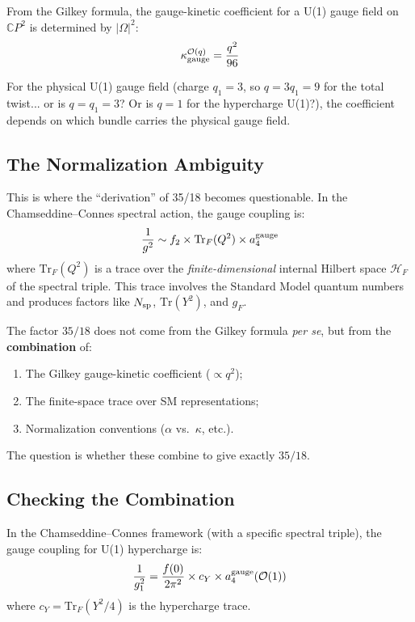 \documentclass[12pt,a4paper]{article}
\theoremstyle{definition}
\begin{document}
From the Gilkey formula, the gauge-kinetic coefficient for a U(1)
gauge field on $\mathbb{C}P^2$ is determined by $|\Omega|^2$:
\begin{equation}
\kappa_{\rm gauge}^{\mathcal{O}(q)} = \frac{q^2}{96}
\end{equation}

For the physical U(1) gauge field (charge $q_1 = 3$, so $q = 3q_1 = 9$
for the total twist... or is $q = q_1 = 3$?  Or is $q = 1$ for the
hypercharge U(1)?), the coefficient depends on which bundle carries
the physical gauge field.

\subsection{The Normalization Ambiguity}

This is where the ``derivation'' of 35/18 becomes questionable.  In
the Chamseddine--Connes spectral action, the gauge coupling is:
\begin{equation}
\frac{1}{g^2} \sim f_2 \times \mathrm{Tr}_F(Q^2) \times a_4^{\rm gauge}
\end{equation}
where $\mathrm{Tr}_F(Q^2)$ is a trace over the \emph{finite-dimensional}
internal Hilbert space $\mathcal{H}_F$ of the spectral triple.  This
trace involves the Standard Model quantum numbers and produces factors
like $N_{\rm sp}$, $\mathrm{Tr}(Y^2)$, and $g_F$.

The factor $35/18$ does not come from the Gilkey formula \emph{per se},
but from the \textbf{combination} of:
\begin{enumerate}
\item The Gilkey gauge-kinetic coefficient ($\propto q^2$);
\item The finite-space trace over SM representations;
\item Normalization conventions ($\alpha$ vs.\ $\kappa$, etc.).
\end{enumerate}

The question is whether these combine to give exactly $35/18$.

\subsection{Checking the Combination}

In the Chamseddine--Connes framework (with a specific spectral triple),
the gauge coupling for U(1) hypercharge is:
\begin{equation}\label{eq:CC-gauge}
\frac{1}{g_1^2} = \frac{f(0)}{2\pi^2} \times c_Y \times
a_4^{\rm gauge}(\mathcal{O}(1))
\end{equation}
where $c_Y = \mathrm{Tr}_F(Y^2/4)$ is the hypercharge trace.
\end{document}
